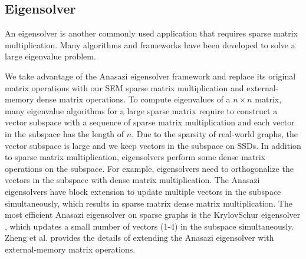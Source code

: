 
\subsection{Eigensolver}
An eigensolver is another commonly used application that requires sparse matrix
multiplication. Many algorithms \cite{Lanczos, IRLM, krylovschur} and frameworks
\cite{arpack, anasazi, slepc} have been developed to solve a large eigenvalue
problem.

We take advantage of the Anasazi eigensolver framework \cite{anasazi} and
replace its original matrix operations with our SEM sparse
matrix multiplication and external-memory dense matrix operations. To compute
eigenvalues of a $n \times n$ matrix, many eigenvalue algorithms for a large
sparse matrix require to construct a vector subspace with a sequence of
sparse matrix multiplication and each vector in the subspace has the length of $n$.
Due to the sparsity of real-world graphs, the vector subspace is large and we keep
vectors in the subspace on SSDs. In addition to sparse matrix
multiplication, eigensolvers perform some dense matrix operations on the subspace.
For example, eigensolvers need to orthogonalize the vectors in the subspace with
dense matrix multiplication. The Anasazi eigensolvers have block extension to
update multiple vectors in the subspace simultaneously, which results in sparse matrix dense
matrix multiplication. The most efficient Anasazi eigensolver on sparse graphs
is the KrylovSchur eigensolver \cite{krylovschur}, which updates a small number
of vectors (1-4) in the subspace simultaneously. Zheng et al.
\cite{flasheigen} provides the details of extending the Anasazi eigensolver
with external-memory matrix operations.


